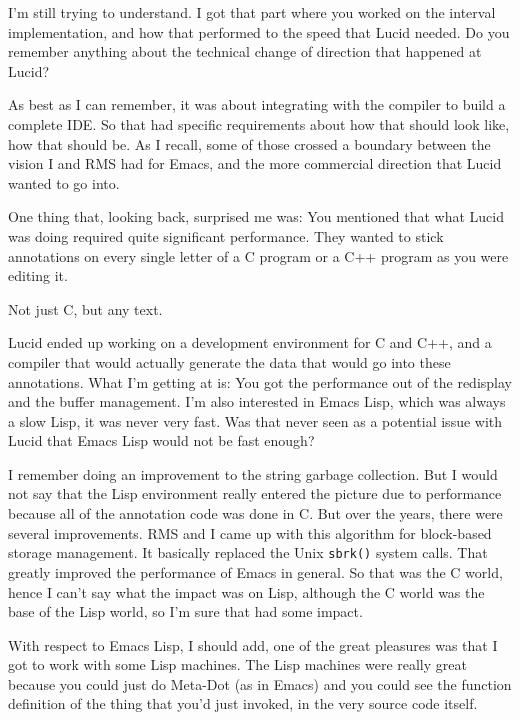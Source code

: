 \documentclass[format=acmsmall,screen]{acmart}
\begin{document}
\begin{question}
I'm still trying to understand. I got that part where you worked on
the interval implementation, and how that performed to the speed that
Lucid needed.  Do you remember anything about the technical change of
direction that happened at Lucid?
\end{question}
%
As best as I can remember, it was about integrating with the
compiler to build a complete IDE.  So that had specific requirements
about how that should look like, how that should be.  As I recall, some of
those crossed a boundary between the vision I and RMS had for Emacs,
and the more commercial direction that Lucid wanted to go into.

\begin{question}
One thing that, looking back, surprised me was: You mentioned that
what Lucid was doing required quite significant performance.  They
wanted to stick annotations on every single letter of a C program or a
C++ program as you were editing it.
\end{question}
%
Not just C, but any text.

\begin{question}
Lucid ended up working on a development environment for C and C++,
and a compiler that would actually generate the data that would go
into these annotations.  What I'm getting at is: You got the
performance out of the redisplay and the buffer management.  I'm also
interested in Emacs Lisp, which was always a slow Lisp, it was never
very fast.  Was that never seen as a potential issue with Lucid that
Emacs Lisp would not be fast enough?
\end{question}
%
I remember doing an improvement to the string garbage collection.
But I would not say that the Lisp environment really entered the
picture due to performance because all of the annotation code was
done in C.  But over the years, there were several improvements.  RMS
and I came up with this algorithm for block-based storage management.
It basically replaced the Unix \texttt{sbrk()} system calls.  That greatly
improved the performance of Emacs in general.  So that was the C
world, hence I can't say what the impact was on Lisp, although the C
world was the base of the Lisp world, so I'm sure that had some
impact.

With respect to Emacs Lisp, I should add, one of the great pleasures
was that I got to work with some Lisp machines.  The Lisp machines
were really great because you could just do Meta-Dot (as in Emacs) and
you could see
the function definition of the thing that you'd just invoked, in the
very source code itself.
\end{document}

